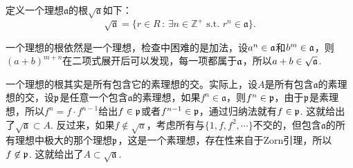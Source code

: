 \para 定义一个理想$\mathfrak{a}$的根$\sqrt{\mathfrak{a}}$如下：
\[
	\sqrt{\mathfrak{a}}=\{r\in R\,:\,\exists n\in \mathbb{Z}^+\text{ s.t. }r^n\in \mathfrak{a}\}.
\]

一个理想的根依然是一个理想，检查中困难的是加法，设$a^n\in \mathfrak{a}$和$b^m\in \mathfrak{a}$，则$(a+b)^{m+n}$在二项式展开后可以发现，每一项都属于$\mathfrak{a}$，所以$a+b\in \sqrt{\mathfrak{a}}$.

一个理想的根其实是所有包含它的素理想的交。实际上，设$A$是所有包含$\mathfrak{a}$的素理想的交，设$\mathfrak{p}$是任意一个包含$\mathfrak{a}$的素理想，如果$f^n\in \mathfrak{a}$，则$f^n\in \mathfrak{p}$，由于$\mathfrak{p}$是素理想，所以$f^n=f\cdot f^{n-1}$给出$f\in\mathfrak{p}$或者$f^{n-1}\in\mathfrak{p}$，通过归纳法就有$f\in \mathfrak{p}$. 这就给出了$\sqrt{\mathfrak{a}}\subset A$. 反过来，如果$f\not\in \sqrt{a}$，考虑所有与$\{1,f,f^2,\cdots\}$不交的，但包含$\mathfrak{a}$的所有理想中极大的那个理想$\mathfrak{p}$，这是一个素理想，存在性来自于Zorn引理，所以$f\not\in \mathfrak{p}$. 这就给出了$A\subset \sqrt{\mathfrak{a}}$.